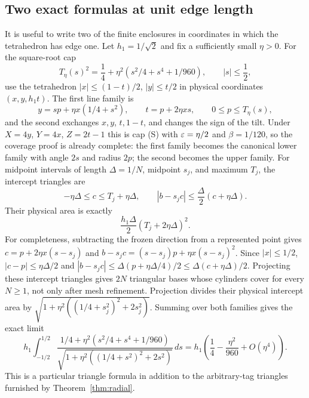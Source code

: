 \subsection{Two exact formulas at unit edge length}

It is useful to write two of the finite enclosures in coordinates in
which the tetrahedron has edge one. Let $h_1=1/\sqrt2$ and fix a
sufficiently small $\eta>0$. For the square-root cap
\[
 T_\eta(s)^2=\frac14+\eta^2\left(s^2/4+s^4+1/960\right),
 \qquad |s|\le\frac12,
\]
use the tetrahedron
$|x|\le(1-t)/2$, $|y|\le t/2$ in physical coordinates
$(x,y,h_1t)$. The first line family is
\[
 y=sp+\eta x(1/4+s^2),\qquad t=p+2\eta xs,
 \qquad 0\le p\le T_\eta(s),
\]
and the second exchanges $x,y$, $t,1-t$, and changes the sign of the
tilt. Under $X=4y$, $Y=4x$, $Z=2t-1$ this is cap (S) with
$\varepsilon=\eta/2$ and $\beta=1/120$, so the coverage proof is already
complete: the first family becomes the canonical lower family with
angle $2s$ and radius $2p$; the second becomes the upper family.
For midpoint intervals of length $\Delta=1/N$, midpoint
$s_j$, and maximum $T_j$, the intercept triangles are
\begin{equation}\label{eq:unit-triangle-foot}
 -\eta\Delta\le c\le T_j+\eta\Delta,
 \qquad |b-s_jc|\le\frac\Delta2(c+\eta\Delta).
\end{equation}
Their physical area is exactly
\begin{equation}\label{eq:unit-triangle-area}
 \frac{h_1\Delta}{2}(T_j+2\eta\Delta)^2.
\end{equation}
For completeness, subtracting the frozen direction from a represented
point gives
$c=p+2\eta x(s-s_j)$ and
$b-s_jc=(s-s_j)p+\eta x(s-s_j)^2$.
Since $|x|\le1/2$,
$|c-p|\le\eta\Delta/2$ and
$|b-s_jc|\le\Delta(p+\eta\Delta/4)/2
\le\Delta(c+\eta\Delta)/2$.
Projecting these intercept triangles gives $2N$ triangular bases whose
cylinders cover for every $N\ge1$, not only after mesh refinement.
Projection divides their physical intercept area by
$\sqrt{1+\eta^2((1/4+s_j^2)^2+2s_j^2)}$.
Summing over both families gives the exact limit
\[
 h_1\int_{-1/2}^{1/2}
 \frac{1/4+\eta^2(s^2/4+s^4+1/960)}
 {\sqrt{1+\eta^2((1/4+s^2)^2+2s^2)}}\,ds
 =h_1\left(\frac14-\frac{\eta^2}{960}+O(\eta^4)\right).
\]
This is a particular triangle formula in addition to the arbitrary-tag
triangles furnished by Theorem~\ref{thm:radial}.

